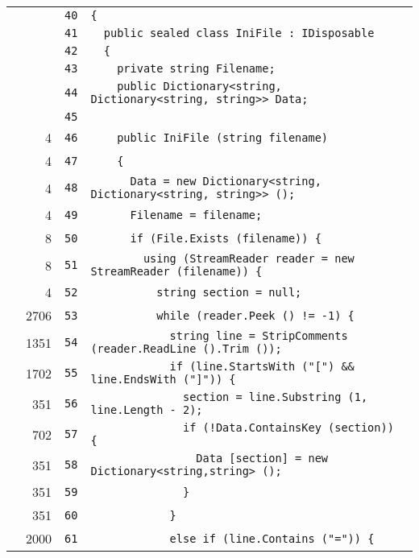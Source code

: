 \documentclass[a4paper,10pt]{article}
\begin{document}
\begin{longtable}[l]{lrrl}
\cellcolor{gray} &  & \verb~40~ & \verb~{~\\
\cellcolor{gray} &  & \verb~41~ & \verb~  public sealed class IniFile : IDisposable~\\
\cellcolor{gray} &  & \verb~42~ & \verb~  {~\\
\cellcolor{gray} &  & \verb~43~ & \verb~    private string Filename;~\\
\cellcolor{gray} &  & \verb~44~ & \verb~    public Dictionary<string, Dictionary<string, string>> Data;~\\
\cellcolor{gray} &  & \verb~45~ & \verb~~\\
\cellcolor{green} & 4 & \verb~46~ & \verb~    public IniFile (string filename)~\\
\cellcolor{green} & 4 & \verb~47~ & \verb~    {~\\
\cellcolor{green} & 4 & \verb~48~ & \verb~      Data = new Dictionary<string, Dictionary<string, string>> ();~\\
\cellcolor{green} & 4 & \verb~49~ & \verb~      Filename = filename;~\\
\cellcolor{green} & 8 & \verb~50~ & \verb~      if (File.Exists (filename)) {~\\
\cellcolor{green} & 8 & \verb~51~ & \verb~        using (StreamReader reader = new StreamReader (filename)) {~\\
\cellcolor{green} & 4 & \verb~52~ & \verb~          string section = null;~\\
\cellcolor{green} & 2706 & \verb~53~ & \verb~          while (reader.Peek () != -1) {~\\
\cellcolor{green} & 1351 & \verb~54~ & \verb~            string line = StripComments (reader.ReadLine ().Trim ());~\\
\cellcolor{green} & 1702 & \verb~55~ & \verb~            if (line.StartsWith ("[") && line.EndsWith ("]")) {~\\
\cellcolor{green} & 351 & \verb~56~ & \verb~              section = line.Substring (1, line.Length - 2);~\\
\cellcolor{green} & 702 & \verb~57~ & \verb~              if (!Data.ContainsKey (section)) {~\\
\cellcolor{green} & 351 & \verb~58~ & \verb~                Data [section] = new Dictionary<string,string> ();~\\
\cellcolor{green} & 351 & \verb~59~ & \verb~              }~\\
\cellcolor{green} & 351 & \verb~60~ & \verb~            }~\\
\cellcolor{green} & 2000 & \verb~61~ & \verb~            else if (line.Contains ("=")) {~\\

\end{longtable}
\end{document}
